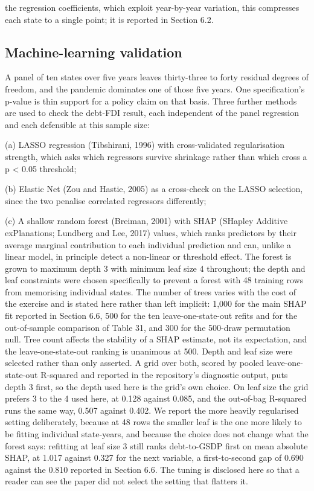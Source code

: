 \documentclass[12pt,a4paper]{article}
\begin{document}
the regression coefficients, which exploit year-by-year variation, this compresses each state to a single point; it is reported in Section 6.2.

\subsection{Machine-learning validation}

A panel of ten states over five years leaves thirty-three to forty residual degrees of freedom, and the pandemic dominates one of those five years. One specification's p-value is thin support for a policy claim on that basis. Three further methods are used to check the debt-FDI result, each independent of the panel regression and each defensible at this sample size:

(a) LASSO regression (Tibshirani, 1996) with cross-validated regularisation strength, which asks which regressors survive shrinkage rather than which cross a p < 0.05 threshold;

(b) Elastic Net (Zou and Hastie, 2005) as a cross-check on the LASSO selection, since the two penalise correlated regressors differently;

(c) A shallow random forest (Breiman, 2001) with SHAP (SHapley Additive exPlanations; Lundberg and Lee, 2017) values, which ranks predictors by their average marginal contribution to each individual prediction and can, unlike a linear model, in principle detect a non-linear or threshold effect. The forest is grown to maximum depth 3 with minimum leaf size 4 throughout; the depth and leaf constraints were chosen specifically to prevent a forest with 48 training rows from memorising individual states. The number of trees varies with the cost of the exercise and is stated here rather than left implicit: 1,000 for the main SHAP fit reported in Section 6.6, 500 for the ten leave-one-state-out refits and for the out-of-sample comparison of Table 31, and 300 for the 500-draw permutation null. Tree count affects the stability of a SHAP estimate, not its expectation, and the leave-one-state-out ranking is unanimous at 500. Depth and leaf size were selected rather than only asserted. A grid over both, scored by pooled leave-one-state-out R-squared and reported in the repository's diagnostic output, puts depth 3 first, so the depth used here is the grid's own choice. On leaf size the grid prefers 3 to the 4 used here, at 0.128 against 0.085, and the out-of-bag R-squared runs the same way, 0.507 against 0.402. We report the more heavily regularised setting deliberately, because at 48 rows the smaller leaf is the one more likely to be fitting individual state-years, and because the choice does not change what the forest says: refitting at leaf size 3 still ranks debt-to-GSDP first on mean absolute SHAP, at 1.017 against 0.327 for the next variable, a first-to-second gap of 0.690 against the 0.810 reported in Section 6.6. The tuning is disclosed here so that a reader can see the paper did not select the setting that flatters it.
\end{document}
